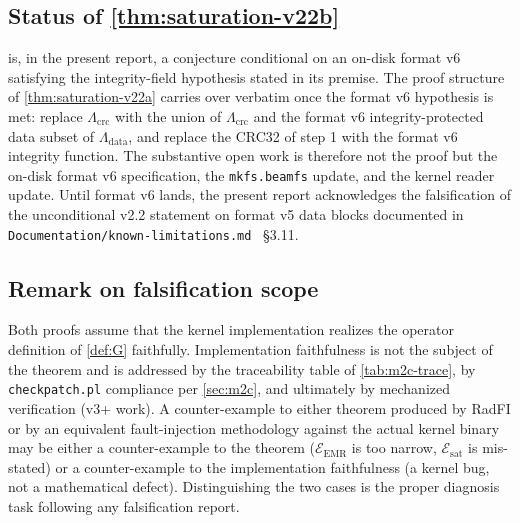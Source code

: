\subsection{Status of \cref{thm:saturation-v22b}}

 is, in the present report, a
conjecture conditional on an on-disk format v6 satisfying the
integrity-field hypothesis stated in its premise. The proof
structure of \cref{thm:saturation-v22a} carries over verbatim
once the format v6 hypothesis is met: replace
\(\Lambda_{\mathrm{crc}}\) with the union of
\(\Lambda_{\mathrm{crc}}\) and the format v6
integrity-protected data subset of \(\Lambda_{\mathrm{data}}\),
and replace the CRC32 of step 1 with the format v6 integrity
function. The substantive open work is therefore not the proof
but the on-disk format v6 specification, the \texttt{mkfs.beamfs}
update, and the kernel reader update. Until format v6 lands, the
present report acknowledges the falsification of the unconditional
v2.2 statement on format v5 data blocks documented in
\texttt{Documentation/known-limitations.md}~\cite{beamfs-impl}
\S3.11.

\subsection{Remark on falsification scope}

Both proofs assume that the kernel implementation realizes the
operator definition of \cref{def:G} faithfully. Implementation
faithfulness is not the subject of the theorem and is addressed
by the traceability table of \cref{tab:m2c-trace}, by
\texttt{checkpatch.pl} compliance per \cref{sec:m2c}, and
ultimately by mechanized verification (v3+ work). A
counter-example to either theorem produced by RadFI or by an
equivalent fault-injection methodology against the actual kernel
binary may be either a counter-example to the theorem
(\(\mathcal{E}_{\mathrm{EMR}}\) is too narrow,
\(\mathcal{E}_{\mathrm{sat}}\) is mis-stated) or a counter-example
to the implementation faithfulness (a kernel bug, not a
mathematical defect). Distinguishing the two cases is the proper
diagnosis task following any falsification report.
